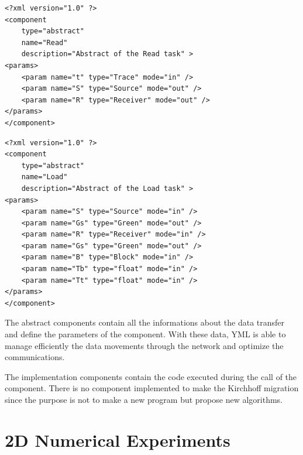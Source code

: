 \begin{lstlisting}[tabsize=5, frame=single, basicstyle=\small\ttfamily, title=Abstract of Read task]
<?xml version="1.0" ?>
<component
	type="abstract"
	name="Read"
	description="Abstract of the Read task" >
<params>
	<param name="t" type="Trace" mode="in" />
	<param name="S" type="Source" mode="out" />
	<param name="R" type="Receiver" mode="out" />
</params>
</component>
\end{lstlisting}

\begin{lstlisting}[tabsize=5, frame=single, basicstyle=\small\ttfamily, title=Abstract of Load task]
<?xml version="1.0" ?>
<component
	type="abstract"
	name="Load"
	description="Abstract of the Load task" >
<params>
	<param name="S" type="Source" mode="in" />
	<param name="Gs" type="Green" mode="out" />
	<param name="R" type="Receiver" mode="in" />
	<param name="Gs" type="Green" mode="out" />
	<param name="B" type="Block" mode="in" />
	<param name="Tb" type="float" mode="in" />
	<param name="Tt" type="float" mode="in" />
</params>
</component>
\end{lstlisting}

The abstract components contain all the informations about the data transfer and define the parameters of the component.
With these data, YML is able to manage efficiently the data movements through the network and optimize the communications.

The implementation components contain the code executed during the call of the component.
There is no component implemented to make the Kirchhoff migration since the purpose is not to make a new program but propose new algorithms.


\section{2D Numerical Experiments}